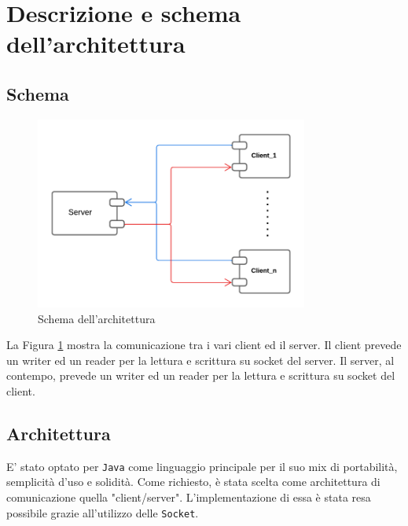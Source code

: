 \section{Descrizione e schema dell'architettura}
\subsection{Schema}
\begin{figure}[h]
    \centering
    \includegraphics[width=0.8\textwidth]{imagens/schema.png}
    \caption{Schema dell'architettura}
    \label{fig:schema}
\end{figure}

La Figura \ref{fig:schema} mostra la comunicazione tra i vari client ed il server. Il client prevede un writer ed un reader per la lettura e scrittura su socket del server. Il server, al contempo, prevede un writer ed un reader per la lettura e scrittura su socket del client.

\subsection{Architettura}
E' stato optato per \texttt{Java} come linguaggio principale per il suo mix di portabilità, semplicità d'uso e solidità.
Come richiesto, è stata scelta come architettura di comunicazione quella "client/server". L'implementazione di essa è stata resa possibile grazie all'utilizzo delle \texttt{Socket}. 

